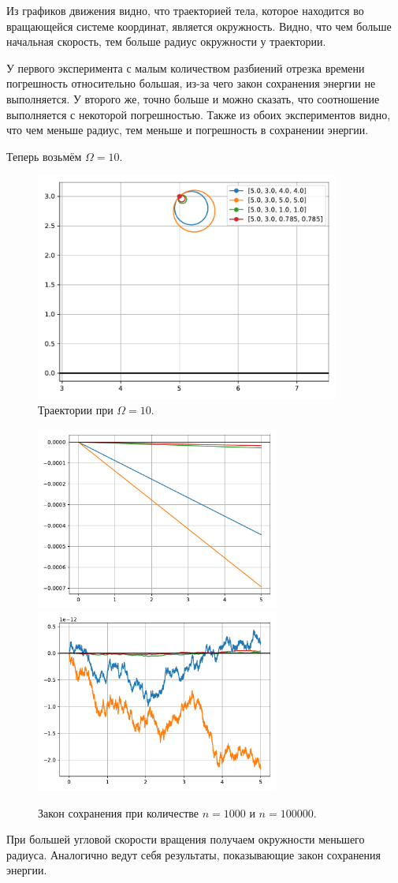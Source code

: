         Из графиков движения видно, что траекторией тела, которое находится во вращающейся системе координат, является окружность. Видно, что чем больше начальная скорость, тем больше радиус окружности у траектории.

        У первого эксперимента с малым количеством разбиений отрезка времени погрешность относительно большая, из-за чего закон сохранения энергии не выполняется. У второго же, точно больше и можно сказать, что соотношение выполняется с некоторой погрешностью. Также из обоих экспериментов видно, что чем меньше радиус, тем меньше и погрешность в сохранении энергии.

        Теперь возьмём \( \Omega = 10 \).
        \begin{figure}[H]
            \centering
            \includegraphics[width=10cm]{pictures/n1e3plot2.pdf}
            \caption{Траектории при \( \Omega = 10 \).}
        \end{figure}

        \begin{figure}[H]
            \centering
            \includegraphics[width=8cm]{pictures/n1e3conv2.pdf}
            \includegraphics[width=8cm]{pictures/n1e5conv2.pdf}
            \caption{Закон сохранения при количестве \( n = 1000 \) и \( n = 100000 \).}
        \end{figure}

        При большей угловой скорости вращения получаем окружности меньшего радиуса. Аналогично ведут себя результаты, показывающие закон сохранения энергии.
